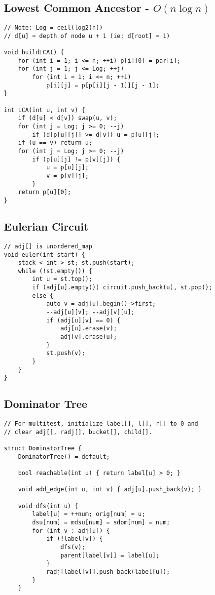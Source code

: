 \documentclass[10pt,landscape]{article}
\begin{document}
\begin{multicols}{2}
\subsection{Lowest Common Ancestor - $O(n\log n)$}
\begin{lstlisting}
// Note: Log = ceil(log2(n))
// d[u] = depth of node u + 1 (ie: d[root] = 1)

void buildLCA() {
    for (int i = 1; i <= n; ++i) p[i][0] = par[i];
    for (int j = 1; j <= Log; ++j)
        for (int i = 1; i <= n; ++i)
            p[i][j] = p[p[i][j - 1]][j - 1];
}

int LCA(int u, int v) {
    if (d[u] < d[v]) swap(u, v);
    for (int j = Log; j >= 0; --j)
        if (d[p[u][j]] >= d[v]) u = p[u][j];
    if (u == v) return u;
    for (int j = Log; j >= 0; --j)
        if (p[u][j] != p[v][j]) {
            u = p[u][j];
            v = p[v][j];
        }
    return p[u][0];
}
\end{lstlisting}
\subsection{Eulerian Circuit}
\begin{lstlisting}
// adj[] is unordered_map
void euler(int start) {
    stack < int > st; st.push(start);
    while (!st.empty()) {
        int u = st.top();
        if (adj[u].empty()) circuit.push_back(u), st.pop();
        else {
            auto v = adj[u].begin()->first;
            --adj[u][v]; --adj[v][u];
            if (adj[u][v] == 0) {
                adj[u].erase(v);
                adj[v].erase(u);
            }
            st.push(v);
        }
    }
}
\end{lstlisting}
\subsection{Dominator Tree}
\begin{lstlisting}
// For multitest, initialize label[], l[], r[] to 0 and
// clear adj[], radj[], bucket[], child[].

struct DominatorTree {
    DominatorTree() = default;

    bool reachable(int u) { return label[u] > 0; }

    void add_edge(int u, int v) { adj[u].push_back(v); }

    void dfs(int u) {
        label[u] = ++num; orig[num] = u;
        dsu[num] = mdsu[num] = sdom[num] = num;
        for (int v : adj[u]) {
            if (!label[v]) {
                dfs(v);
                parent[label[v]] = label[u];
            }
            radj[label[v]].push_back(label[u]);
        }
    }
     

\end{lstlisting}
\end{multicols}
\end{document}
